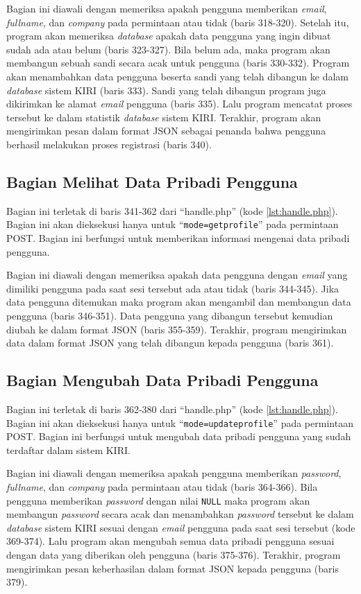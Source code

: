 Bagian ini diawali dengan memeriksa apakah pengguna memberikan \textit{email}, \textit{fullname}, dan \textit{company} pada permintaan atau tidak (baris 318-320). Setelah itu, program akan memeriksa \textit{database} apakah data pengguna yang ingin dibuat sudah ada atau belum (baris 323-327). Bila belum ada, maka program akan membangun sebuah sandi secara acak untuk pengguna (baris 330-332). Program akan menambahkan data pengguna beserta sandi yang telah dibangun ke dalam \textit{database} sistem KIRI (baris 333). Sandi yang telah dibangun program juga dikirimkan ke alamat \textit{email} pengguna (baris 335). Lalu program mencatat proses tersebut ke dalam statistik \textit{database} sistem KIRI. Terakhir, program akan mengirimkan pesan dalam format JSON sebagai penanda bahwa pengguna berhasil melakukan proses registrasi (baris 340).

\subsection{Bagian Melihat Data Pribadi Pengguna}
\label{sec:lihatdatadiri}
Bagian ini terletak di baris 341-362 dari ``handle.php'' (kode \ref{lst:handle.php}). Bagian ini akan dieksekusi hanya untuk ``\texttt{mode=getprofile}'' pada permintaan POST. Bagian ini berfungsi untuk memberikan informasi mengenai data pribadi pengguna.

Bagian ini diawali dengan memeriksa apakah data pengguna dengan \textit{email} yang dimiliki pengguna pada saat sesi tersebut ada atau tidak (baris 344-345). Jika data pengguna ditemukan maka program akan mengambil dan membangun data pengguna (baris 346-351). Data pengguna yang dibangun tersebut kemudian diubah ke dalam format JSON (baris 355-359). Terakhir, program mengirimkan data dalam format JSON yang telah dibangun kepada pengguna (baris 361).

\subsection{Bagian Mengubah Data Pribadi Pengguna}
\label{sec:ubahdatadiri}
Bagian ini terletak di baris 362-380 dari ``handle.php'' (kode \ref{lst:handle.php}). Bagian ini akan dieksekusi hanya untuk ``\texttt{mode=updateprofile}'' pada permintaan POST. Bagian ini berfungsi untuk mengubah data pribadi pengguna yang sudah terdaftar dalam sistem KIRI.

Bagian ini diawali dengan memeriksa apakah pengguna memberikan \textit{password}, \textit{fullname}, dan \textit{company} pada permintaan atau tidak (baris 364-366). Bila pengguna memberikan \textit{password} dengan nilai \texttt{NULL} maka program akan membangun \textit{password} secara acak dan menambahkan \textit{password} tersebut ke dalam \textit{database} sistem KIRI sesuai dengan \textit{email} pengguna pada saat sesi tersebut (kode 369-374). Lalu program akan mengubah semua data pribadi pengguna sesuai dengan data yang diberikan oleh pengguna (baris 375-376). Terakhir, program mengirimkan pesan keberhasilan dalam format JSON kepada pengguna (baris 379).

